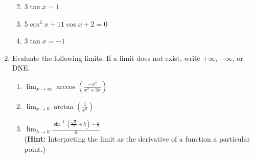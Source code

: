 \documentclass[12pt]{article}
\newif\ifans
\begin{document}
\begin{enumerate}
\begin{enumerate}
\ifans\fbox{$\frac{\pi}{2}$, $\arcsin\left(\frac{3}{4}\right)$, $\pi-\arcsin\left(\frac{3}{4}\right)$} \fi

\item $3\tan{x}=1$

\ifans \fbox{$\tan^{-1}\left(\frac{1}{3}\right)$, $\pi+\tan^{-1}\left(\frac{1}{3}\right)$} \fi

\item $5\cos^2{x}+11\cos{x}+2=0$

\ifans \fbox{\parbox{1\linewidth}{
Notice that solving this equation reduces to solving $\cos{x}=-\frac{1}{5}$.  So, there are solutions in both quadrants II and III.  The reference angle is $\arccos\left(\frac{1}{5}\right)$.  Thus, the two solutions of the given equation are $\pi - \arccos\left(\frac{1}{5}\right)$ and $\pi + \arccos\left(\frac{1}{5}\right)$.\\
\\
Alternatively, one could find the angle in the second quadrant by calculating $\arccos\left(-\frac{1}{5}\right)$.  Then, the angle in the third quadrant is $2\pi-\arccos\left(-\frac{1}{5}\right)$}} \fi

\item $3\tan{x}=-1$

\ifans \fbox{$\pi+\tan^{-1}\left(-\frac{1}{3}\right)$, $2\pi+\tan^{-1}\left(-\frac{1}{3}\right)$} \fi

\end{enumerate}

\item Evaluate the following limits.  If a limit does not exist, write $+\infty$, $-\infty$, or DNE.

\begin{enumerate}

\item $\displaystyle \lim_{x\rightarrow \infty}{\arccos{\left(\frac{-x^2}{x^2+3x}\right)}}$ 

\ifans{\fbox{$\displaystyle \pi$}} \fi

\item $\displaystyle \lim_{x\rightarrow 0}{\arctan{\left(\frac{1}{x^2}\right)}}$ 

\ifans{\fbox{$\displaystyle \frac{\pi}{2}$}} \fi

\item $\lim_{h \rightarrow 0}{\frac{\sin^{-1}{\left(\frac{\sqrt{3}}{2}+h\right)}-\frac{\pi}{3}}{h}}$ \\({\bf Hint:} Interpreting the limit as the derivative of a function a particular point.)


\end{enumerate}
\end{enumerate}
\end{document}
